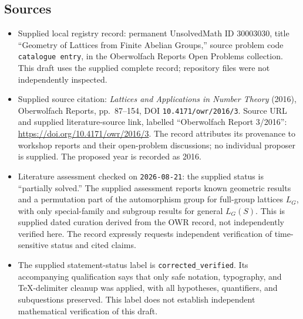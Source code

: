\documentclass[11pt]{article}
\begin{document}
\subsection{Sources}
\begin{itemize}
\item Supplied local registry record: permanent UnsolvedMath ID \(30003030\), title ``Geometry of Lattices from Finite Abelian Groups,'' source problem code \texttt{catalogue entry}, in the Oberwolfach Reports Open Problems collection. This draft uses the supplied complete record; repository files were not independently inspected.
\item Supplied source citation: \emph{Lattices and Applications in Number Theory} (2016), Oberwolfach Reports, pp.~87--154, DOI \texttt{10.4171/owr/2016/3}. Source URL and supplied literature-source link, labelled ``Oberwolfach Report 3/2016'': \url{https://doi.org/10.4171/owr/2016/3}. The record attributes its provenance to workshop reports and their open-problem discussions; no individual proposer is supplied. The proposed year is recorded as 2016.
\item Literature assessment checked on \texttt{2026-08-21}: the supplied status is ``partially solved.'' The supplied assessment reports known geometric results and a permutation part of the automorphism group for full-group lattices \(L_G\), with only special-family and subgroup results for general \(L_G(S)\). This is supplied dated curation derived from the OWR record, not independently verified here. The record expressly requests independent verification of time-sensitive status and cited claims.
\item The supplied statement-status label is \texttt{corrected\_verified}. Its accompanying qualification says that only safe notation, typography, and TeX-delimiter cleanup was applied, with all hypotheses, quantifiers, and subquestions preserved. This label does not establish independent mathematical verification of this draft.
\end{itemize}
\end{document}
